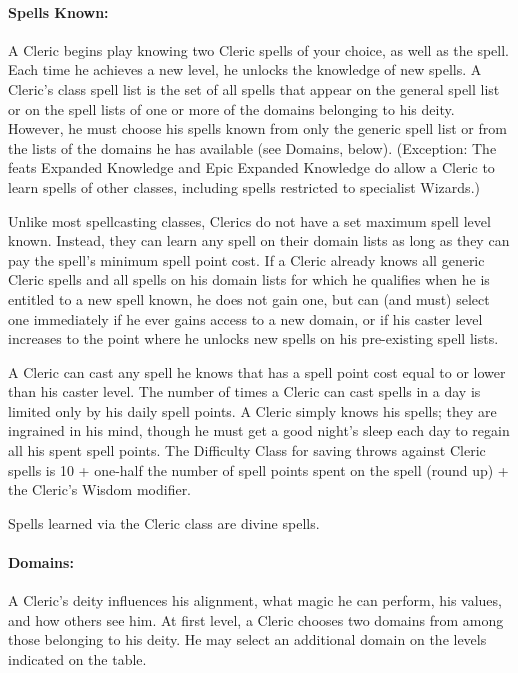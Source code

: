 \paragraph{Spells Known:} A Cleric begins play knowing two Cleric spells of your choice, 
as well as the  spell. 
Each time he achieves a new level, he unlocks the knowledge of new spells.
A Cleric's class spell list is the set of all spells that appear on the general  spell list or on the spell lists of one or more of the domains belonging to his deity. However, he must choose his spells known from only the generic spell list or from the lists of the domains he has available (see Domains, below).
(Exception: The feats Expanded Knowledge and Epic Expanded Knowledge do allow a Cleric to learn spells of other classes, 
including spells restricted to specialist Wizards.) 

Unlike most spellcasting classes, Clerics do not have a set maximum spell level known.
Instead, they can learn any spell on their domain lists as long as they can pay the spell's minimum spell point cost.
If a Cleric already knows all generic Cleric spells and all spells on his domain lists for which he qualifies when he is entitled to a new spell known, he does not gain one, but can (and must) select one immediately if he ever gains access to a new domain, or if his caster level increases to the point where he unlocks new spells on his pre-existing spell lists.

A Cleric can cast any spell he knows that has a spell point cost equal to or lower than his caster level.
The number of times a Cleric can cast spells in a day is limited only by his daily spell points. 
A Cleric simply knows his spells; they are ingrained in his mind, though he must get a good night's sleep each day to regain all his spent spell points.
The Difficulty Class for saving throws against Cleric spells is 10 + one-half the number of spell points spent on the spell (round up) + the Cleric's Wisdom modifier. 

Spells learned via the Cleric class are divine spells.
\paragraph{Domains:}
A Cleric's deity influences his alignment, what magic he can perform, his values, and how others see him. 
At first level, a Cleric chooses two domains from among those belonging to his deity.
He may select an additional domain on the levels indicated on the  table.

